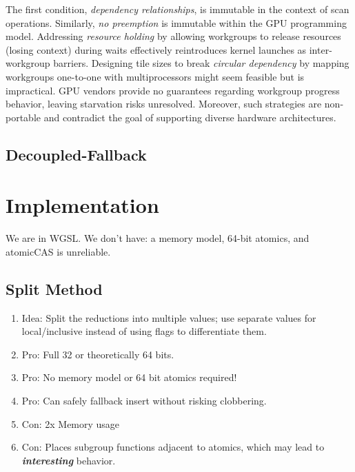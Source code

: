 \documentclass[sigconf]{acmart}
\begin{document}
The first condition, \emph{dependency relationships}, is immutable in the context of scan operations. Similarly, \emph{no preemption} is immutable within the GPU programming model. Addressing \emph{resource holding} by allowing workgroups to release resources (losing context) during waits effectively reintroduces kernel launches as inter-workgroup barriers. Designing tile sizes to break \emph{circular dependency} by mapping workgroups one-to-one with multiprocessors might seem feasible but is impractical. GPU vendors provide no guarantees regarding workgroup progress behavior, leaving starvation risks unresolved. Moreover, such strategies are non-portable and contradict the goal of supporting diverse hardware architectures.

\subsection{Decoupled-Fallback}

\section{Implementation}
We are in WGSL. We don't have: a memory model, 64-bit atomics, and atomicCAS is unreliable. 

\subsection{Split Method}
\begin{enumerate}
    \item Idea: Split the reductions into multiple values; use separate values for local/inclusive instead of using flags to differentiate them.
    \item Pro: Full 32 or theoretically 64 bits.
    \item Pro: No memory model or 64 bit atomics required!
    \item Pro: Can safely fallback insert without risking clobbering.
    \item Con: 2x Memory usage
    \item Con: Places subgroup functions adjacent to atomics, which may lead to \textbf{\textit{interesting}} behavior.
\end{enumerate}
\end{document}
